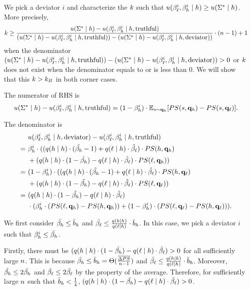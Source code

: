 We pick a deviator $i$ and characterize the $k$ such that $u(\beta_{\ell}^i, \beta_{h}^i \mid h) \ge u(\Sigma^* \mid h)$. More precisely, 
\begin{equation*}
    k \ge \frac{u(\Sigma^* \mid h) - u(\beta_{\ell}^i, \beta_{h}^i \mid h, \text{truthful})}{(u(\Sigma^* \mid h) - u(\beta_{\ell}^i, \beta_{h}^i \mid h, \text{truthful})) - (u(\Sigma^* \mid h) - u(\beta_{\ell}^i, \beta_{h}^i \mid h, \text{deviator}))}\cdot (n - 1) + 1
\end{equation*}
when the denominator $(u(\Sigma^* \mid h) - u(\beta_{\ell}^i, \beta_{h}^i \mid h, \text{truthful})) - (u(\Sigma^* \mid h) - u(\beta_{\ell}^i, \beta_{h}^i \mid h, \text{deviator})) > 0$ or $k$ does not exist when the denominator equals to or is less than $0$. 
We will show that this $k > k_B$ in both corner cases. 

The numerator of RHS is  
\begin{align*}
    u(\Sigma^* \mid h) - u(\beta_{\ell}^i, \beta_{h}^i \mid h, \text{truthful}) = (1 - \beta_{h}^i)\cdot \mathbb{E}_{s\sim \mathbf{q}_{h}}[PS(s, \mathbf{q}_{h}) - PS(s, \mathbf{q}_{\ell})]. 
\end{align*}

The denominator is 
\begin{align*}
    &\ u(\beta_{\ell}^i, \beta_{h}^i \mid h, \text{deviator}) - u(\beta_{\ell}^i, \beta_{h}^i \mid h, \text{truthful})\\
    =&\ \beta_{h}^i \cdot ( (q(h\mid h)\cdot (\hat{\beta_{h}}  - 1) + q(\ell \mid h) \cdot \hat{\beta_{\ell}})\cdot PS(h, \mathbf{q}_h)\\
    &\ + (q(h\mid h)\cdot (1 - \hat{\beta_{h}}) - q(\ell \mid h) \cdot \hat{\beta_{\ell}})\cdot PS(\ell, \mathbf{q}_h))\\
    =&\ ( 1 - \beta_{h}^i ) \cdot ( (q(h\mid h)\cdot (\hat{\beta_{h}}  - 1) + q(\ell \mid h) \cdot \hat{\beta_{\ell}})\cdot PS(h, \mathbf{q}_\ell)\\
    &\ + (q(h\mid h)\cdot (1 - \hat{\beta_{h}}) - q(\ell \mid h) \cdot \hat{\beta_{\ell}})\cdot PS(\ell, \mathbf{q}_\ell))\\
    =&\ (q(h\mid h)\cdot (1 - \hat{\beta_{h}}) - q(\ell \mid h) \cdot \hat{\beta_{\ell}})\\
    &\ \cdot (\beta_{h}^i  \cdot (PS(\ell, \mathbf{q}_h) - PS(h, \mathbf{q}_h)) + ( 1- \beta_{h}^i) \cdot (PS(\ell, \mathbf{q}_\ell) - PS(h, \mathbf{q}_\ell))). 
\end{align*} 

We first consider $\bar{\beta_{h}} \le \bar{b}_h$ and $\bar{\beta_{\ell}} \le \frac{q(h \mid h)}{q(\ell \mid h)} \cdot \bar{b}_h$. In this case, we pick a deviator $i$ such that $\beta_{h}^i \le \bar{\beta_{h}}$. 

Firstly, there must be $(q(h\mid h)\cdot (1 - \hat{\beta_{h}}) - q(\ell \mid h) \cdot \hat{\beta_{\ell}}) > 0$ for all sufficiently large $n$. This is because $\bar{\beta_{h}} \le \bar{b}_h = \Theta(\frac{\overline{\Delta PS}}{n - 1})$ and $\bar{\beta_{\ell}} \le \frac{q(h\mid h)}{q(\ell \mid h)}\cdot \bar{b}_h$. Moreover, $\hat{\beta_{h}} \le 2 \bar{\beta_{h}}$ and $\hat{\beta_{\ell}} \le 2\bar{\beta_{\ell}}$ by the property of the average. Therefore, for sufficiently large $n$ such that $\bar{b}_h < \frac14$, $(q(h\mid h)\cdot (1 - \hat{\beta_{h}}) - q(\ell \mid h) \cdot \hat{\beta_{\ell}}) > 0$. 

